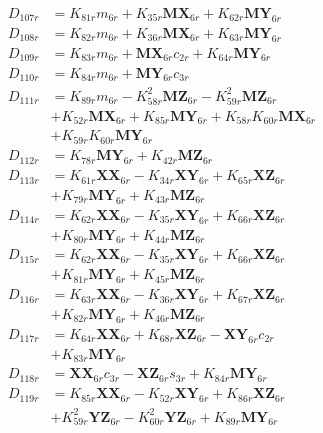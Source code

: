 \begin{multicols}{2}
\begin{align}
D_{107r} &= K_{81r}m_{6r} + K_{35r}\mathbf{MX}_{6r} + K_{62r}\mathbf{MY}_{6r} \nonumber \\
D_{108r} &= K_{82r}m_{6r} + K_{36r}\mathbf{MX}_{6r} + K_{63r}\mathbf{MY}_{6r} \nonumber \\
D_{109r} &= K_{83r}m_{6r} + \mathbf{MX}_{6r}c_{2r} + K_{64r}\mathbf{MY}_{6r} \nonumber \\
D_{110r} &= K_{84r}m_{6r} + \mathbf{MY}_{6r}c_{3r} \nonumber \\
D_{111r} &= K_{89r}m_{6r} - K_{58r}^2\mathbf{MZ}_{6r} - K_{59r}^2\mathbf{MZ}_{6r}  \nonumber \\
&+ K_{52r}\mathbf{MX}_{6r} + K_{85r}\mathbf{MY}_{6r} + K_{58r}K_{60r}\mathbf{MX}_{6r}  \nonumber \\
&+ K_{59r}K_{60r}\mathbf{MY}_{6r} \nonumber \\
D_{112r} &= K_{78r}\mathbf{MY}_{6r} + K_{42r}\mathbf{MZ}_{6r} \nonumber \\
D_{113r} &= K_{61r}\mathbf{XX}_{6r} - K_{34r}\mathbf{XY}_{6r} + K_{65r}\mathbf{XZ}_{6r}  \nonumber \\
&+ K_{79r}\mathbf{MY}_{6r} + K_{43r}\mathbf{MZ}_{6r} \nonumber \\
D_{114r} &= K_{62r}\mathbf{XX}_{6r} - K_{35r}\mathbf{XY}_{6r} + K_{66r}\mathbf{XZ}_{6r}  \nonumber \\
&+ K_{80r}\mathbf{MY}_{6r} + K_{44r}\mathbf{MZ}_{6r} \nonumber \\
D_{115r} &= K_{62r}\mathbf{XX}_{6r} - K_{35r}\mathbf{XY}_{6r} + K_{66r}\mathbf{XZ}_{6r}  \nonumber \\
&+ K_{81r}\mathbf{MY}_{6r} + K_{45r}\mathbf{MZ}_{6r} \nonumber \\
D_{116r} &= K_{63r}\mathbf{XX}_{6r} - K_{36r}\mathbf{XY}_{6r} + K_{67r}\mathbf{XZ}_{6r}  \nonumber \\
&+ K_{82r}\mathbf{MY}_{6r} + K_{46r}\mathbf{MZ}_{6r} \nonumber \\
D_{117r} &= K_{64r}\mathbf{XX}_{6r} + K_{68r}\mathbf{XZ}_{6r} - \mathbf{XY}_{6r}c_{2r}  \nonumber \\
&+ K_{83r}\mathbf{MY}_{6r} \nonumber \\
D_{118r} &= \mathbf{XX}_{6r}c_{3r} - \mathbf{XZ}_{6r}s_{3r} + K_{84r}\mathbf{MY}_{6r} \nonumber \\
D_{119r} &= K_{85r}\mathbf{XX}_{6r} - K_{52r}\mathbf{XY}_{6r} + K_{86r}\mathbf{XZ}_{6r}  \nonumber \\
&+ K_{59r}^2\mathbf{YZ}_{6r} - K_{60r}^2\mathbf{YZ}_{6r} + K_{89r}\mathbf{MY}_{6r}  \nonumber \\

\end{align}
\end{multicols}
